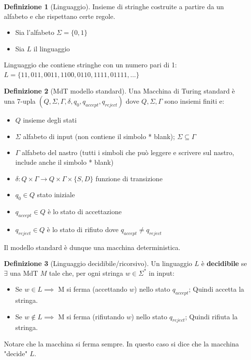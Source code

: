 \documentclass{article}  %
\theoremstyle{definition}
\newtheorem{definition}{Definizione}[section]
\begin{document}
\begin{definition}[Linguaggio]
	Insieme di stringhe costruite a partire da un alfabeto e che rispettano certe regole.
	\begin{esempio}[Esempio]
		\footnotesize %
		\begin{itemize}
			\item Sia l'alfabeto $\Sigma=\{0,1\}$
			\item Sia $L$ il linguaggio
		\end{itemize}
		Linguaggio che contiene stringhe con un numero pari di 1:\newline
		$L=\{11,011,0011,1100,0110,1111,01111,\dots\}$
	\end{esempio}
\end{definition}

\begin{definition}[MdT modello standard] Una Macchina di Turing standard è una 7-upla
	$(Q,\Sigma,\Gamma,\delta,q_0,q_{accept}, q_{reject})$ dove $Q,\Sigma,\Gamma$ sono insiemi finiti e:
	\begin{itemize}
		\item $Q$ insieme degli stati
		\item $\Sigma$ alfabeto di input (non contiene il simbolo * blank); $\Sigma \subseteq \Gamma$
		\item $\Gamma$ alfabeto del nastro (tutti i simboli che può leggere e scrivere sul nastro, include anche il simbolo * blank)
		\item $\delta:Q\times\Gamma \rightarrow Q\times\Gamma\times\{S,D\}$ funzione di transizione
		\item $q_0 \in Q$ stato iniziale
		\item $q_{accept} \in Q$ è lo stato di accettazione
		\item $q_{reject} \in Q$ è lo stato di rifiuto dove $q_{accept} \neq q_{reject}$
	\end{itemize}
	Il modello standard è dunque una macchina deterministica.
\end{definition}

\begin{definition}[Linguaggio decidibile/ricorsivo]
	Un linguaggio $L$ è \textbf{decidibile} se $\exists$ una MdT $M$ tale che, per ogni stringa $w\in \Sigma^*$ in input:
	\begin{itemize}
		\item Se $w \in L \implies$ M si ferma (accettando $w$) nello stato $q_{accept}$; Quindi accetta la stringa.
		\item Se $w \notin L \implies$ M si ferma (rifiutando $w$) nello stato $q_{reject}$; Quindi rifiuta la stringa.
	\end{itemize}
	Notare che la macchina si ferma sempre. In questo caso si dice che la macchina "decide" $L$.
\end{definition}
\end{document}
